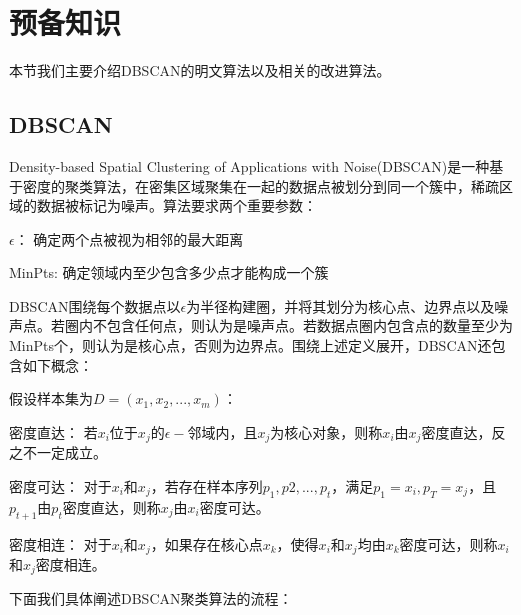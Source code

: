 \section{预备知识}
本节我们主要介绍DBSCAN的明文算法以及相关的改进算法。
\label{s4-yubei}
\subsection{DBSCAN}
Density-based Spatial Clustering of Applications with Noise(DBSCAN)是一种基于密度的聚类算法，在密集区域聚集在一起的数据点被划分到同一个簇中，稀疏区域的数据被标记为噪声\cite{khan2014dbscan}。算法要求两个重要参数：
\begin{compactitem}
	\item $\epsilon$： 确定两个点被视为相邻的最大距离
	\item MinPts: 确定领域内至少包含多少点才能构成一个簇
\end{compactitem}

DBSCAN围绕每个数据点以$\epsilon$为半径构建圈，并将其划分为核心点、边界点以及噪声点。若圈内不包含任何点，则认为是噪声点。若数据点圈内包含点的数量至少为MinPts个，则认为是核心点，否则为边界点。围绕上述定义展开，DBSCAN还包含如下概念：

假设样本集为$D=(x_1,x_2,...,x_m)$：
\begin{compactitem}
	\item 密度直达： 若$ x_i $位于$ x_j $的$ \epsilon- $邻域内，且$ x_j $为核心对象，则称$ x_i $由$ x_j $密度直达，反之不一定成立。
	\item 密度可达： 对于$ x_i $和$ x_j $，若存在样本序列$ p_1,p2,...,p_t $，满足$ p_1=x_i,p_T=x_j $，且$ p_{t+1} $由$ p_t $密度直达，则称$ x_j $由$ x_i $密度可达。
	\item 密度相连： 对于$ x_i $和$ x_j $，如果存在核心点$ x_k $，使得$ x_i $和$ x_j $均由$ x_k $密度可达，则称$ x_i $和$ x_j $密度相连。
\end{compactitem}


下面我们具体阐述DBSCAN聚类算法的流程：

